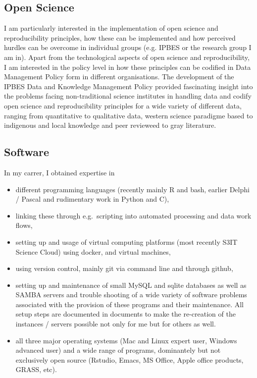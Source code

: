 \documentclass[a4paper]{article}
\begin{document}
\subsection{Open Science}

I am particularly interested in the implementation of open science and
	reproducibility principles, how these can be implemented and how
	perceived hurdles can be overcome in individual groups (e.g. IPBES or
	the research group I am in). 
Apart from the technological aspects of open science and reproducibility, 
  I am interested in the policy level in how these principles can be codified
  in Data Management Policy form in different organisations. The development
  of the IPBES Data and Knowledge Management Policy provided fascinating insight
  into the problems facing non-traditional science institutes in handling data 
  and codify open science and reproducibility principles for a wide variety of different data, ranging from
  quantitative to qualitative data, western science paradigme based to
  indigenous and local knowledge and peer revieweed to gray literature.

\subsection{Software}

In my carrer, I obtained expertise in

\begin{itemize}[leftmargin=1.1in]

\item different programming languages (recently mainly R and bash,
	earlier Delphi / Pascal and rudimentary work in Python and C),

\item linking these through e.g.\ scripting into automated processing
	and data work flows,

\item setting up and usage of virtual computing platforms (most
	recently S3IT Science Cloud) using docker, and virtual machines,

\item using version control, mainly git via command line and through github,

\item setting up and maintenance of small MySQL and sqlite databases as
	well as SAMBA servers and trouble shooting of a wide variety of
	software problems associated with the provision of these programs and
	their maintenance. All setup steps are documented in documents to
	make the re-creation of the instances / servers possible not only for
	me but for others as well.

\item all three major operating systems (Mac and Linux expert
	user, Windows advanced user) and a wide range of programs,
	dominantely but not exclusively open source (Rstudio, Emacs, MS
	Office, Apple office products, GRASS, etc).

\end{itemize}
    
\end{document}
